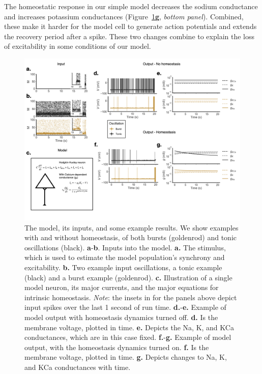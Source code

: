 \documentclass{article}
\begin{document}
The homeostatic response in our simple model decreases the sodium conductance and increases potassium conductances (Figure~\ref{fig:f1}\textbf{g}, \textit{bottom panel}). Combined, these make it harder for the model cell to generate action potentials and extends the recovery period after a spike. These two changes combine to explain the loss of excitability in some conditions of our model.

\begin{figure}
\centering
\includegraphics[width=1\textwidth]{fig1.png}
\caption{\label{fig:f1}
    The model, its inputs, and some example results. We show examples with and without homeostasis, of both bursts (goldenrod) and tonic oscillations (black).
    \textbf{a}-\textbf{b}. Inputs into the model. \textbf{a.} The stimulus, which is used to estimate the model population's synchrony and excitability. \textbf{b.} Two example input oscillations, a tonic example (black) and a burst example (goldenrod).
    \textbf{c.} Illustration of a single model neuron, its major currents, and the major equations for intrinsic homeostasis. 
    \textit{Note}: the insets in for the panels above depict input spikes over the last 1 second of run time.
    \textbf{d.}-\textbf{e.} Example of model output with homeostasis dynamics turned off. \textbf{d.} Is the membrane voltage, plotted in time. \textbf{e.} Depicts the Na, K, and KCa conductances, which are in this case fixed.
    \textbf{f.}-\textbf{g.} Example of model output, with the homeostasis dynamics turned on. \textbf{f.} Is the membrane voltage, plotted in time. \textbf{g.} Depicts changes to Na, K, and KCa conductances with time. 
}
\end{figure}
\end{document}
